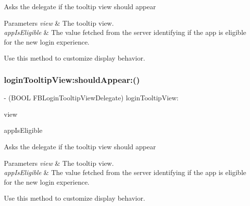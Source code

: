 Asks the delegate if the tooltip view should appear


\begin{DoxyParams}{Parameters}
{\em view} & The tooltip view. \\
\hline
{\em app\+Is\+Eligible} & The value fetched from the server identifying if the app is eligible for the new login experience.\\
\hline
\end{DoxyParams}
Use this method to customize display behavior. \mbox{\label{protocolFBLoginTooltipViewDelegate_01-p_a0b9d5ac15bf779f27017b5f8a7a32450}} 
\subsubsection{\texorpdfstring{login\+Tooltip\+View\+:should\+Appear\+:()}{loginTooltipView:shouldAppear:()}\hspace{0.1cm}{\footnotesize\ttfamily [4/5]}}
{\footnotesize\ttfamily -\/ (B\+O\+OL F\+B\+Login\+Tooltip\+View\+Delegate) login\+Tooltip\+View\+: \begin{DoxyParamCaption}\item[{(\hyperlink{interfaceFBLoginTooltipView}{F\+B\+Login\+Tooltip\+View} $\ast$)}]{view }\item[{shouldAppear:(B\+O\+OL)}]{app\+Is\+Eligible }\end{DoxyParamCaption}\hspace{0.3cm}{\ttfamily [optional]}}

Asks the delegate if the tooltip view should appear


\begin{DoxyParams}{Parameters}
{\em view} & The tooltip view. \\
\hline
{\em app\+Is\+Eligible} & The value fetched from the server identifying if the app is eligible for the new login experience.\\
\hline
\end{DoxyParams}
Use this method to customize display behavior. \mbox{\label{protocolFBLoginTooltipViewDelegate_01-p_a0b9d5ac15bf779f27017b5f8a7a32450}} 

